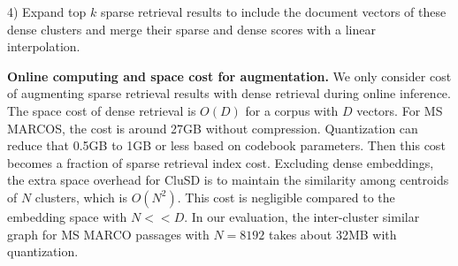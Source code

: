 4) Expand top $k$ sparse retrieval results to include the document vectors of these dense clusters and
merge their sparse and dense scores with a linear interpolation.  



{\bf Online computing and space  cost for augmentation.} We only consider cost of  augmenting sparse retrieval results with dense retrieval during online inference. 
The space cost of dense retrieval is $O(D)$  for a corpus with $D$ vectors.
For MS MARCOS, the cost is around 27GB without compression. Quantization can  reduce that  0.5GB  to 1GB or less based on codebook parameters.
Then this cost becomes a fraction of sparse retrieval index cost.  
Excluding dense embeddings, the extra space overhead  for CluSD is to maintain  the similarity among centroids of $N$ clusters, which is  $O(N^2)$.
This cost is  negligible compared  to the embedding space with $N << D$.  In our evaluation, 
the inter-cluster similar graph for MS MARCO passages with $N=8192$ takes about 32MB with quantization.

